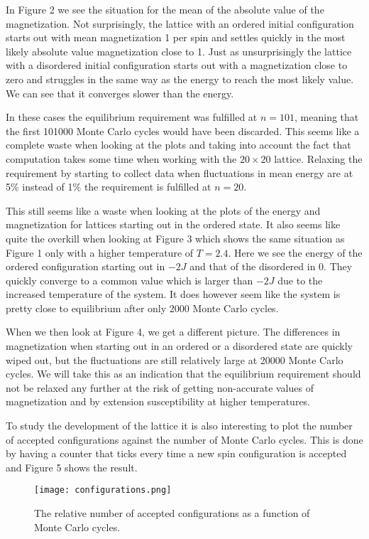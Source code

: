 \documentclass[english, 12pt]{article}
\begin{document}
In Figure 2 we see the situation for the mean of the absolute value of the magnetization. Not surprisingly, the lattice with an ordered initial configuration starts out with mean magnetization 1 per spin and settles quickly in the most likely absolute value magnetization close to 1. Just as unsurprisingly the lattice with a disordered initial configuration starts out with a magnetization close to zero and struggles in the same way as the energy to reach the most likely value. We can see that it converges slower than the energy.

In these cases the equilibrium requirement was fulfilled at $n=101$, meaning that the first 101000 Monte Carlo cycles would have been discarded. This seems like a complete waste when looking at the plots and taking into account the fact that computation takes some time when working with the $20\times20$ lattice. Relaxing the requirement by starting to collect data when fluctuations in mean energy are at 5\% instead of 1\% the requirement is fulfilled at $n=20$. 

This still seems like a waste when looking at the plots of the energy and magnetization for lattices starting out in the ordered state. It also seems like quite the overkill when looking at Figure 3 which shows the same situation as Figure 1 only with a higher temperature of $T=2.4$. Here we see the energy of the ordered configuration starting out in $-2J$ and that of the disordered in 0. They quickly converge to a common value which is larger than $-2J$ due to the increased temperature of the system. It does however seem like the system is pretty close to equilibrium after only 2000 Monte Carlo cycles.

When we then look at Figure 4, we get a different picture. The differences in magnetization when starting out in an ordered or a disordered state are quickly wiped out, but the fluctuations are still relatively large at 20000 Monte Carlo cycles. We will take this as an indication that the equilibrium requirement should not be relaxed any further at the risk of getting non-accurate values of magnetization and by extension susceptibility at higher temperatures.


To study the development of the lattice it is also interesting to plot the number of accepted configurations against the number of Monte Carlo cycles. This is done by having a counter that ticks every time a new spin configuration is accepted and Figure 5 shows the result.

\begin{figure}[hbt!]
\centering
\texttt{[image: configurations.png]}
\caption{The relative number of accepted configurations as a function of Monte Carlo cycles.}
\end{figure}
\end{document}
